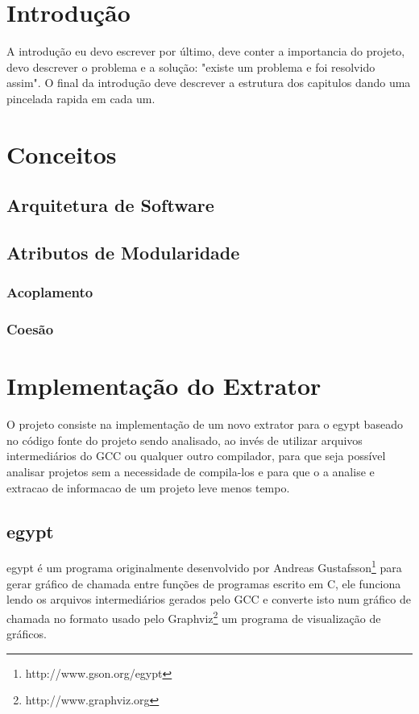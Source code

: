 \chapter{Introdução}

A introdução eu devo escrever por último, deve conter a importancia do projeto, devo descrever o problema e a solução: "existe um problema e foi resolvido assim". O final da introdução deve descrever a estrutura dos capitulos dando uma pincelada rapida em cada um.

\chapter{Conceitos}
\section{Arquitetura de Software}
\section{Atributos de Modularidade}
\subsection{Acoplamento}
\subsection{Coesão}

\chapter{Implementação do Extrator}

O projeto consiste na implementação de um novo extrator para o egypt baseado no código fonte do projeto sendo analisado, ao invés de utilizar arquivos intermediários do GCC ou qualquer outro compilador, para que seja possível analisar projetos sem a necessidade de compila-los e para que o a analise e extracao de informacao de um projeto leve menos tempo.

\section{egypt}

egypt é um programa originalmente desenvolvido por Andreas Gustafsson\footnote{http://www.gson.org/egypt} para gerar gráfico de chamada entre funções de programas escrito em C, ele funciona lendo os arquivos intermediários gerados pelo GCC e converte isto num gráfico de chamada no formato usado pelo Graphviz\footnote{http://www.graphviz.org} um programa de visualização de gráficos.


